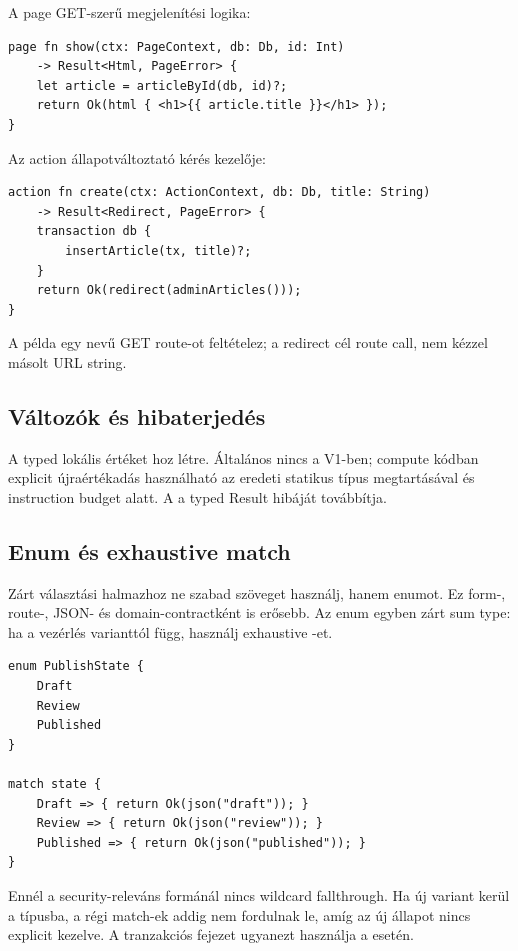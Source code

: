 A page GET-szerű megjelenítési logika:

\begin{lstlisting}[language=RWLang]
page fn show(ctx: PageContext, db: Db, id: Int)
    -> Result<Html, PageError> {
    let article = articleById(db, id)?;
    return Ok(html { <h1>{{ article.title }}</h1> });
}
\end{lstlisting}

Az action állapotváltoztató kérés kezelője:

\begin{lstlisting}[language=RWLang]
action fn create(ctx: ActionContext, db: Db, title: String)
    -> Result<Redirect, PageError> {
    transaction db {
        insertArticle(tx, title)?;
    }
    return Ok(redirect(adminArticles()));
}
\end{lstlisting}

A példa egy  nevű GET route-ot feltételez; a redirect cél route call, nem kézzel másolt URL string.

\subsection*{Változók és hibaterjedés}

A  typed lokális értéket hoz létre. Általános  nincs a V1-ben; compute kódban explicit  újraértékadás használható az eredeti statikus típus megtartásával és instruction budget alatt. A  a typed Result hibáját továbbítja.

\subsection*{Enum és exhaustive match}

Zárt választási halmazhoz ne szabad szöveget használj, hanem enumot. Ez form-, route-, JSON- és domain-contractként is erősebb. Az enum egyben zárt sum type: ha a vezérlés varianttól függ, használj exhaustive -et.

\begin{lstlisting}[language=RWLang]
enum PublishState {
    Draft
    Review
    Published
}

match state {
    Draft => { return Ok(json("draft")); }
    Review => { return Ok(json("review")); }
    Published => { return Ok(json("published")); }
}
\end{lstlisting}

Ennél a security-releváns formánál nincs wildcard fallthrough. Ha új variant kerül a típusba, a régi match-ek addig nem fordulnak le, amíg az új állapot nincs explicit kezelve. A tranzakciós fejezet ugyanezt használja a  esetén.

